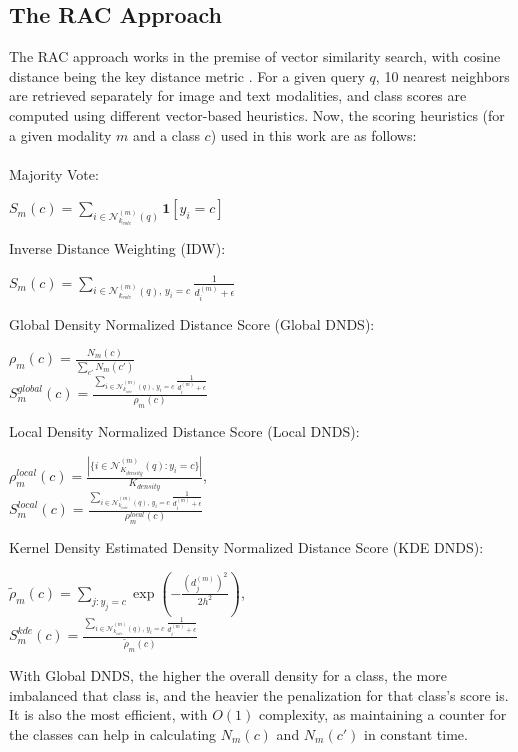 \documentclass{article}
\begin{document}
\subsection{The RAC Approach}

The RAC approach works in the premise of vector similarity search, with cosine distance being the key distance metric \cite{meng2025multimodal}. For a given query $q$, 10 nearest neighbors are retrieved separately for image and text modalities, and class scores are computed using different vector-based heuristics. Now, the scoring heuristics (for a given modality $m$ and a class $c$) used in this work are as follows: \\\\
Majority Vote:
\begin{center}
    $S_m(c) = \sum_{i \in \mathcal{N}^{(m)}_{k_{vote}}(q)} \mathbf{1}[y_i = c]$
\end{center} 
Inverse Distance Weighting (IDW):
\begin{center}
      $S_m(c) = \sum_{i \in \mathcal{N}^{(m)}_{k_{vote}}(q),\, y_i=c} \frac{1}{d_i^{(m)} + \epsilon} $
\end{center} 
Global Density Normalized Distance Score (Global DNDS):
\begin{center}
  $\rho_m(c) = \frac{N_m(c)}{\sum_{c'} N_m(c')}$ \\
  $S_m^{global}(c) = \frac{\sum_{i \in \mathcal{N}^{(m)}_{k_{vote}}(q),\, y_i=c} \frac{1}{d_i^{(m)} + \epsilon}}{\rho_m(c)}$
\end{center} 
Local Density Normalized Distance Score (Local DNDS):
\begin{center}
  $\rho_m^{local}(c) = 
  \frac{\left| \{ i \in \mathcal{N}_{K_{density}}^{(m)}(q) : y_i = c \} \right|}
  {K_{density}}$,\\
  $S_m^{local}(c) = \frac{\sum_{i \in \mathcal{N}^{(m)}_{k_{vote}}(q),\, y_i=c} \frac{1}{d_i^{(m)} + \epsilon}}{\rho_m^{local}(c)}$
\end{center}
Kernel Density Estimated Density Normalized Distance Score (KDE DNDS):
\begin{center}
  $\tilde{\rho}_m(c) = \sum_{j : y_j = c} 
  \exp\left( -\frac{\left(d_j^{(m)}\right)^2}{2h^2} \right)$, \\ \vspace{10pt}
  $S_m^{kde}(c) = \frac{\sum_{i \in \mathcal{N}^{(m)}_{k_{vote}}(q),\, y_i=c} \frac{1}{d_i^{(m)} + \epsilon}}{\tilde{\rho}_m(c)}$
\end{center} 

With Global DNDS, the higher the overall density for a class, the more imbalanced that class is, and the heavier the penalization for that class's score is. It is also the most efficient, with $O(1)$ complexity, as maintaining a counter for the classes can help in calculating $N_m(c)$ and $N_m(c')$ in constant time.
\end{document}

